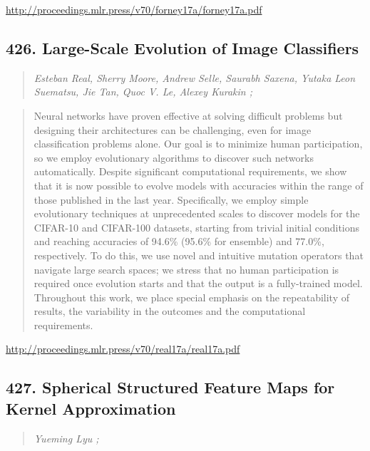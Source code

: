 \documentclass{article}
\begin{document}
\href{http://proceedings.mlr.press/v70/forney17a/forney17a.pdf}{http://proceedings.mlr.press/v70/forney17a/forney17a.pdf}

\subsection{426. Large-Scale Evolution of Image Classifiers}

\begin{quote}
\footnotesize{\textit{Esteban Real, Sherry Moore, Andrew Selle, Saurabh Saxena, Yutaka Leon Suematsu, Jie Tan, Quoc V. Le, Alexey Kurakin ;}}
\end{quote}

\begin{quote}
    Neural networks have proven effective at solving difficult problems but designing their architectures can be challenging, even for image classification problems alone. Our goal is to minimize human participation, so we employ evolutionary algorithms to discover such networks automatically. Despite significant computational requirements, we show that it is now possible to evolve models with accuracies within the range of those published in the last year. Specifically, we employ simple evolutionary techniques at unprecedented scales to discover models for the CIFAR-10 and CIFAR-100 datasets, starting from trivial initial conditions and reaching accuracies of 94.6\% (95.6\% for ensemble) and 77.0\%, respectively. To do this, we use novel and intuitive mutation operators that navigate large search spaces; we stress that no human participation is required once evolution starts and that the output is a fully-trained model. Throughout this work, we place special emphasis on the repeatability of results, the variability in the outcomes and the computational requirements.  \end{quote}

\href{http://proceedings.mlr.press/v70/real17a/real17a.pdf}{http://proceedings.mlr.press/v70/real17a/real17a.pdf}

\subsection{427. Spherical Structured Feature Maps for Kernel Approximation}

\begin{quote}
\footnotesize{\textit{Yueming Lyu ;}}
\end{quote}
\end{document}
